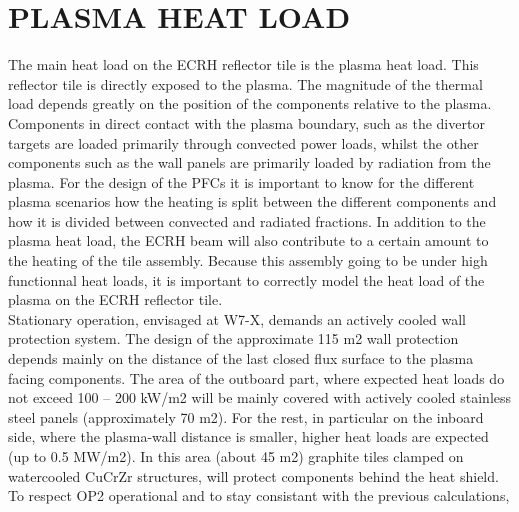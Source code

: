 \section{PLASMA HEAT LOAD}
\normalsize{The main heat load on the \acrshort{ECRH} reflector tile is the plasma heat load. This reflector tile is directly exposed to the plasma. The magnitude of the thermal load depends greatly on the position of the components relative to the plasma. Components in direct contact with the plasma boundary, such as the divertor targets are loaded primarily through convected power loads, whilst the other components such as the wall panels are primarily loaded by radiation from the plasma. For the design of the \acrshort{PFCs} it is important to know for the different plasma scenarios how the heating is split between the different components and how it is divided between convected and radiated fractions. In addition to the plasma heat load, the ECRH beam will also contribute to a certain amount to the heating of the tile assembly. Because this assembly going to be under high functionnal heat loads, it is important to correctly model the heat load of the plasma on the \acrshort{ECRH} reflector tile.}
\\
\break
\normalsize{\indent Stationary operation, envisaged at \acrshort{W7-X}, demands an actively cooled wall protection system. The design of the approximate 115 m2 wall protection depends mainly on the distance of the last closed flux surface to the plasma facing components. The area of the outboard part, where expected heat loads do not exceed 100 – 200 kW/m2 will be mainly covered with actively cooled stainless steel panels (approximately 70 m2). For the rest, in particular on the inboard side, where the plasma-wall distance is smaller, higher heat loads are expected (up to 0.5 MW/m2). In this area (about 45 m2) graphite tiles clamped on watercooled CuCrZr structures, will protect components behind the heat shield.}
\\
\break
\normalsize{\indent To respect \acrshort{OP2} operational and to stay consistant with the previous calculations,}